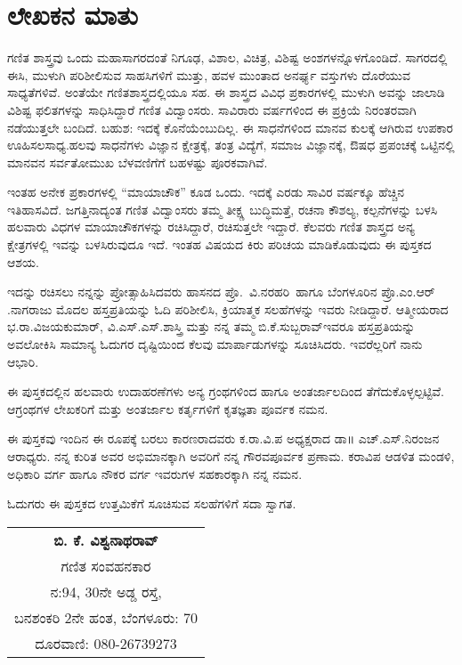 \chapter*{ಲೇಖಕನ ಮಾತು}

\phantom{a}

\vskip  -1.2cm

\quad 
ಗಣಿತ ಶಾಸ್ತ್ರವು ಒಂದು ಮಹಾಸಾಗರದಂತೆ ನಿಗೂಢ, ವಿಶಾಲ, ವಿಚಿತ್ರ, ವಿಶಿಷ್ಟ ಅಂಶಗಳನ್ನೊಳಗೊಂಡಿದೆ. ಸಾಗರದಲ್ಲಿ ಈಸಿ, ಮುಳುಗಿ ಪರಿಶೀಲಿಸುವ ಸಾಹಸಿಗಳಿಗೆ ಮುತ್ತು, ಹವಳ ಮುಂತಾದ ಅನರ್ಘ್ಯ ವಸ್ತುಗಳು ದೊರೆಯುವ ಸಾಧ್ಯತೆಗಳಿವೆ. ಅಂತೆಯೇ ಗಣಿತಶಾಸ್ತ್ರದಲ್ಲಿಯೂ ಸಹ. ಈ ಶಾಸ್ತ್ರದ ವಿವಿಧ ಪ್ರಕಾರಗಳಲ್ಲಿ ಮುಳುಗಿ ಅವನ್ನು ಜಾಲಾಡಿ ವಿಶಿಷ್ಟ ಫಲಿತ\-ಗಳನ್ನು ಸಾಧಿಸಿದ್ದಾರೆ ಗಣಿತ ವಿದ್ವಾಂಸರು. ಸಾವಿರಾರು ವರ್ಷಗಳಿಂದ ಈ ಪ್ರಕ್ರಿಯೆ ನಿರಂತರ\-ವಾಗಿ ನಡೆಯುತ್ತಲೇ ಬಂದಿದೆ. ಬಹುಶ: ಇದಕ್ಕೆ ಕೊನೆಯೆಂಬುದಿಲ್ಲ. ಈ ಸಾಧನೆಗಳಿಂದ ಮಾನವ ಕುಲಕ್ಕೆ ಆಗಿರುವ ಉಪಕಾರ ಊಹಿಸಲಸಾಧ್ಯ.ಹಲವು ಸಾಧನೆಗಳು ವಿಜ್ಞಾನ ಕ್ಷೇತ್ರಕ್ಕೆ, ತಂತ್ರ ವಿದ್ಯೆಗೆ, ಸಮಾಜ ವಿಜ್ಞಾನಕ್ಕೆ, ಔಷಧ ಪ್ರಪಂಚಕ್ಕೆ ಒಟ್ಟಿನಲ್ಲಿ ಮಾನವನ ಸರ್ವತೋಮುಖ \linebreak ಬೆಳವಣಿಗೆಗೆ ಬಹಳಷ್ಟು ಪೂರಕವಾಗಿವೆ.

ಇಂತಹ ಅನೇಕ ಪ್ರಕಾರಗಳಲ್ಲಿ “ಮಾಯಾಚೌಕ” ಕೂಡ ಒಂದು. ಇದಕ್ಕೆ ಎರಡು ಸಾವಿರ ವರ್ಷಕ್ಕೂ ಹೆಚ್ಚಿನ ಇತಿಹಾಸವಿದೆ. ಜಗತ್ತಿನಾದ್ಯಂತ ಗಣಿತ ವಿದ್ವಾಂಸರು ತಮ್ಮ ತೀಕ್ಷ್ಣ ಬುದ್ಧಿ\-ಮತ್ತೆ, ರಚನಾ ಕೌಶಲ್ಯ, ಕಲ್ಪನೆಗಳನ್ನು ಬಳಸಿ ಹಲವಾರು ವಿಧಗಳ ಮಾಯಾಚೌಕ\-ಗಳನ್ನು ರಚಿಸಿ\-ದ್ದಾರೆ, ರಚಿಸುತ್ತಲೇ ಇದ್ದಾರೆ. ಕೆಲವರು ಗಣಿತ ಶಾಸ್ತ್ರದ ಅನ್ಯ ಕ್ಷೇತ್ರಗಳಲ್ಲಿ ಇವನ್ನು ಬಳಸಿರುವುದೂ ಇದೆ. ಇಂತಹ ವಿಷಯದ ಕಿರು ಪರಿಚಯ ಮಾಡಿಕೊಡುವುದು ಈ ಪುಸ್ತಕದ ಆಶಯ.

ಇದನ್ನು ರಚಿಸಲು ನನ್ನನ್ನು ಪ್ರೋತ್ಸಾಹಿಸಿದವರು  ಹಾಸನದ \hbox{ಪ್ರೊ. ವಿ.ನರಹರಿ ಹಾಗೂ} ಬೆಂಗಳೂರಿನ ಪ್ರೊ.ಎಂ.ಆರ್​.ನಾಗರಾಜು ಮೊದಲ ಹಸ್ತಪ್ರತಿಯನ್ನು ಓದಿ ಪರಿಶೀಲಿಸಿ, \linebreak ಕ್ರಿಯಾತ್ಮಕ ಸಲಹೆಗಳನ್ನು ಇವರು ನೀಡಿದ್ದಾರೆ. ಆತ್ಮೀಯರಾದ ಭ.ರಾ.ವಿಜಯಕುಮಾರ್​, ವಿ.ಎಸ್​.ಎಸ್​.ಶಾಸ್ತ್ರಿ ಮತ್ತು ನನ್ನ ತಮ್ಮ ಬಿ.ಕೆ.ಸುಬ್ಬರಾವ್​ ಇವರೂ ಹಸ್ತಪ್ರತಿಯನ್ನು \linebreak ಅವಲೋಕಿಸಿ ಸಾಮಾನ್ಯ ಓದುಗರ ದೃಷ್ಟಿಯಿಂದ ಕೆಲವು ಮಾರ್ಪಾಡುಗಳನ್ನು ಸೂಚಿಸಿದರು. \linebreak ಇವರೆಲ್ಲರಿಗೆ ನಾನು ಆಭಾರಿ.
\eject

ಈ ಪುಸ್ತಕದಲ್ಲಿನ ಹಲವಾರು ಉದಾಹರಣೆಗಳು ಅನ್ಯ ಗ್ರಂಥಗಳಿಂದ ಹಾಗೂ \linebreak ಅಂತರ್ಜಾಲದಿಂದ ತೆಗೆದುಕೊಳ್ಳಲ್ಪಟ್ಟಿವೆ. ಆಗ್ರಂಥಗಳ ಲೇಖಕರಿಗೆ ಮತ್ತು ಅಂತರ್ಜಾಲ \linebreak ಕರ್ತೃಗಳಿಗೆ ಕೃತಜ್ಞತಾ ಪೂರ್ವಕ ನಮನ.

ಈ ಪುಸ್ತಕವು ಇಂದಿನ ಈ ರೂಪಕ್ಕೆ ಬರಲು ಕಾರಣರಾದವರು ಕ.ರಾ.ವಿ.ಪ ಅಧ್ಯಕ್ಷರಾದ ಡಾ॥ ಎಚ್​.ಎಸ್​.ನಿರಂಜನ ಆರಾಧ್ಯರು. ನನ್ನ ಕುರಿತ ಅವರ ಅಭಿಮಾನಕ್ಕಾಗಿ ಅವರಿಗೆ ನನ್ನ ಗೌರವಪೂರ್ವಕ ಪ್ರಣಾಮ. ಕರಾವಿಪ ಆಡಳಿತ ಮಂಡಳಿ, ಅಧಿಕಾರಿ ವರ್ಗ ಹಾಗೂ ನೌಕರ ವರ್ಗ ಇವರುಗಳ ಸಹಕಾರಕ್ಕಾಗಿ ನನ್ನ ನಮನ.

ಓದುಗರು ಈ ಪುಸ್ತಕದ ಉತ್ತಮಿಕೆಗೆ ಸೂಚಿಸುವ ಸಲಹೆಗಳಿಗೆ ಸದಾ ಸ್ವಾಗತ.

\begin{flushright}
\begin{tabular}{c}
{\bf ಬಿ. ಕೆ. ವಿಶ್ವನಾಥರಾವ್}\\
ಗಣಿತ ಸಂವಹನಕಾರ\\
ನ:{\rm 94}, {\rm 30}ನೇ ಅಡ್ಡ ರಸ್ತೆ, \\
ಬನಶಂಕರಿ {\rm 2}ನೇ ಹಂತ, ಬೆಂಗಳೂರು: {\rm 70}\\
ದೂರವಾಣಿ: {\rm 080-26739273}
\end{tabular}
\end{flushright}
